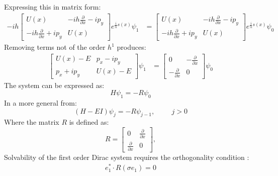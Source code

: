 			Expressing this in matrix form:
			\begin{align}
				-ih
				\left[\begin{array}{cc}
					U\left(x\right)&-ih\frac{\partial}{\partial x}-ip_{y}\\
					-ih\frac{\partial}{\partial x}+ip_{y}&U\left(x\right)
				\end{array}\right]
				e^{\frac{i}{h}s\left(x\right)}\psi_{1}
				&=
				\left[\begin{array}{cc}
					U\left(x\right)&-ih\frac{\partial}{\partial x}-ip_{y}\\
					-ih\frac{\partial}{\partial x}+ip_{y}&U\left(x\right)
				\end{array}\right]
				e^{\frac{i}{h}s\left(x\right)}\psi_{0}
			\end{align}
			Removing terms not of the order $h^{1}$ produces:
			\begin{align}
				\left[\begin{array}{cc}
					U\left(x\right)-E&p_{x}-ip_{y}\\
					p_{x}+ip_{y}&U\left(x\right)-E
				\end{array}\right]
				\psi_{1}&=
				\left[\begin{array}{cc}
					0&-\frac{\partial}{\partial x}\\
					-\frac{\partial}{\partial x}&0
				\end{array}\right]
				\psi_{0}
			\end{align}
			The system can be expressed as:
			\begin{equation}
				H\psi_{1}=-R\psi_{0}
			\end{equation}
			In a more general from:
			\begin{equation}
				\left(H-EI\right)\psi_{j}=-R\psi_{j-1},\hspace{1cm}j>0
			\end{equation}
			Where the matrix $R$ is defined as:
			\begin{equation}
				R=
				\left[\begin{array}{cc}
					0&\frac{\partial}{\partial x}\\
					\frac{\partial}{\partial x}&0
				\end{array}\right],
			\end{equation}
			Solvability of the first order Dirac system requires the orthogonality condition \cite{b31}:
			\begin{gather}
				e^{*}_{1}\cdot R\left(\sigma e_{1}\right)=0
			\end{gather}
